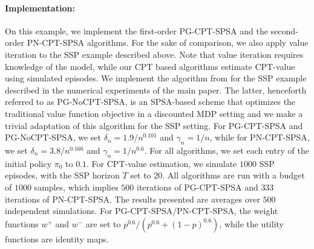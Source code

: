 \documentclass[11pt,letterpaper,english]{article}
\begin{document}
\paragraph{Implementation:} On this example, we implement the first-order PG-CPT-SPSA and the second-order PN-CPT-SPSA algorithms. For the sake of comparison, we also apply value iteration to the SSP example described above. 
Note that value iteration requires knowledge of the model, while our CPT based algorithms estimate CPT-value using simulated episodes.
We implement the algorithm from \cite{bhatnagar2004simultaneous} for the SSP example described in the numerical experiments of the main paper. The latter, henceforth referred to as PG-NoCPT-SPSA, is an SPSA-based scheme that optimizes the traditional value function objective in a discounted MDP setting and we make a trivial adaptation of this algorithm for the SSP setting.
For PG-CPT-SPSA and PG-NoCPT-SPSA, we set $\delta_n = 1.9/n^{0.101}$ and $\gamma_n = 1/n$, while for PN-CPT-SPSA, we set $\delta_n=3.8/n^{0.166}$ and $\gamma_n=1/n^{0.6}$. For all algorithms, we set each entry of the initial policy $\pi_0$ to $0.1$. For CPT-value estimation, we simulate $1000$ SSP episodes, with the SSP horizon $T$ set to $20$. All algorithms are run with a budget of $1000$ samples, which implies $500$ iterations of PG-CPT-SPSA and $333$ iterations of PN-CPT-SPSA. The results presented are averages over $500$ independent simulations. For PG-CPT-SPSA/PN-CPT-SPSA, 
the weight functions $w^+$ and $w^-$ are set to $p^{0.6}/(p^{0.6}+(1-p)^{0.6})$, while the utility functions are identity maps. 
\end{document}
